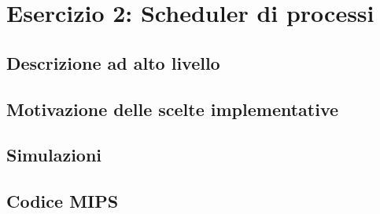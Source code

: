 \section*{Esercizio 2: Scheduler di processi}

    \subsection*{Descrizione ad alto livello}
    
    \subsection*{Motivazione delle scelte implementative}
    
    \subsection*{Simulazioni}
    
    \subsection*{Codice MIPS}
